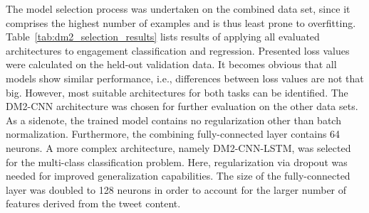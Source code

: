 The model selection process was undertaken on the combined data set, since it
comprises the highest number of examples and is thus least prone to overfitting.
Table~\ref{tab:dm2_selection_results} lists results of applying all evaluated
architectures to engagement classification and regression.
Presented loss values were calculated on the held-out validation data.
It becomes obvious that all models show similar performance, i.e., differences
between loss values are not that big.
However, most suitable architectures for both tasks can be identified.
The DM2-CNN architecture was chosen for further evaluation on the other data
sets.
As a sidenote, the trained model contains no regularization other than batch
normalization.
Furthermore, the combining fully-connected layer contains 64 neurons.
A more complex architecture, namely DM2-CNN-LSTM, was selected for the multi-class
classification problem.
Here, regularization via dropout was needed for improved generalization capabilities.
The size of the fully-connected layer was doubled to 128 neurons in order to
account for the larger number of features derived from the tweet content.
